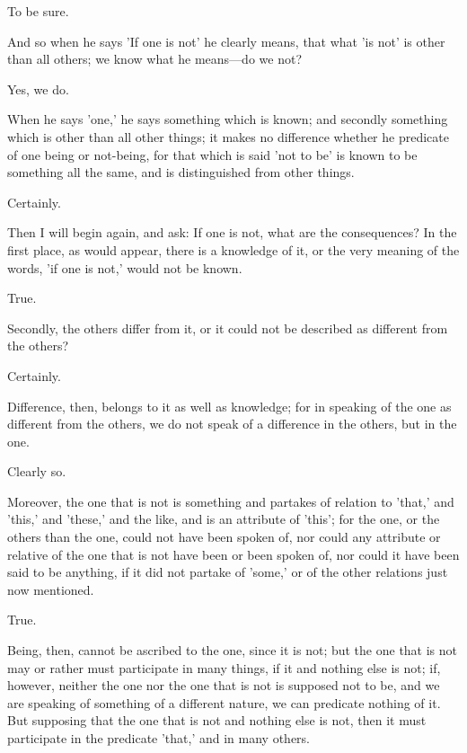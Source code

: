 \documentclass[11pt,letter]{article}
\begin{document}
\par  To be sure.

\par  And so when he says 'If one is not' he clearly means, that what 'is not' is other than all others; we know what he means—do we not?

\par  Yes, we do.

\par  When he says 'one,' he says something which is known; and secondly something which is other than all other things; it makes no difference whether he predicate of one being or not-being, for that which is said 'not to be' is known to be something all the same, and is distinguished from other things.

\par  Certainly.

\par  Then I will begin again, and ask: If one is not, what are the consequences? In the first place, as would appear, there is a knowledge of it, or the very meaning of the words, 'if one is not,' would not be known.

\par  True.

\par  Secondly, the others differ from it, or it could not be described as different from the others?

\par  Certainly.

\par  Difference, then, belongs to it as well as knowledge; for in speaking of the one as different from the others, we do not speak of a difference in the others, but in the one.

\par  Clearly so.

\par  Moreover, the one that is not is something and partakes of relation to 'that,' and 'this,' and 'these,' and the like, and is an attribute of 'this'; for the one, or the others than the one, could not have been spoken of, nor could any attribute or relative of the one that is not have been or been spoken of, nor could it have been said to be anything, if it did not partake of 'some,' or of the other relations just now mentioned.

\par  True.

\par  Being, then, cannot be ascribed to the one, since it is not; but the one that is not may or rather must participate in many things, if it and nothing else is not; if, however, neither the one nor the one that is not is supposed not to be, and we are speaking of something of a different nature, we can predicate nothing of it. But supposing that the one that is not and nothing else is not, then it must participate in the predicate 'that,' and in many others.
\end{document}
